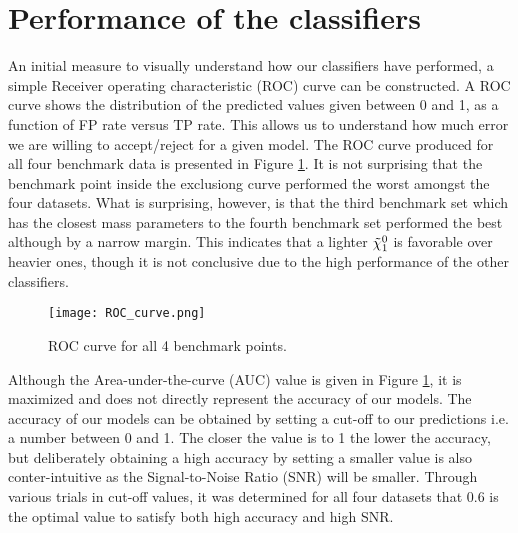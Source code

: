
\section{Performance of the classifiers}
An initial measure to visually understand how our classifiers have performed, a simple Receiver operating characteristic (ROC) curve can be constructed. A ROC curve shows the distribution of the predicted values given between 0 and 1, as a function of FP rate versus TP rate. This allows us to understand how much error we are willing to accept/reject for a given model. The ROC curve produced for all four benchmark data is presented in Figure \ref{fig:ROC}. It is not surprising that the benchmark point inside the exclusiong curve performed the worst amongst the four datasets. What is surprising, however, is that the third benchmark set which has the closest mass parameters to the fourth benchmark set performed the best although by a narrow margin. This indicates that a lighter $\Tilde{\chi}_1^0$ is favorable over heavier ones, though it is not conclusive due to the high performance of the other classifiers. \\


\begin{figure}[htbp]
    \centering
    \texttt{[image: ROC\_curve.png]}
    \caption{ROC curve for all 4 benchmark points.}
    \label{fig:ROC}
\end{figure} 

Although the Area-under-the-curve (AUC) value is given in Figure \ref{fig:ROC}, it is maximized and does not directly represent the accuracy of our models. The accuracy of our models can be obtained by setting a cut-off to our predictions i.e. a number between 0 and 1. The closer the value is to 1 the lower the accuracy, but deliberately obtaining a high accuracy by setting a smaller value is also conter-intuitive as the Signal-to-Noise Ratio (SNR) will be smaller. Through various trials in cut-off values, it was determined for all four datasets that 0.6 is the optimal value to satisfy both high accuracy and high SNR. \\

